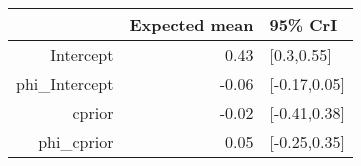\begin{tabular}{rrl}
  \hline
 & Expected mean & 95\% CrI \\ 
  \hline
Intercept & 0.43 & [0.3,0.55] \\ 
  phi\_Intercept & -0.06 & [-0.17,0.05] \\ 
  cprior & -0.02 & [-0.41,0.38] \\ 
  phi\_cprior & 0.05 & [-0.25,0.35] \\ 
   \hline
\end{tabular}

